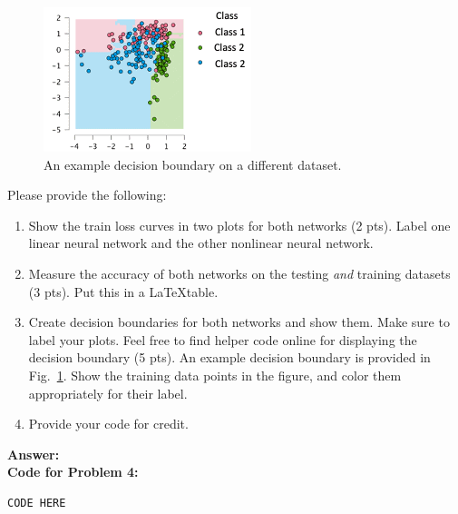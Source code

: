 \documentclass[11pt, oneside]{article}   	%
\begin{document}
\begin{figure}
    \centering
    \includegraphics{example.png}
    \caption{An example decision boundary on a different dataset.}
    \label{fig:example}
\end{figure}


Please provide the following:
\begin{enumerate}
    \item Show the train loss curves in two plots for both networks (2 pts). Label one linear neural network and the other nonlinear neural network.
    \item Measure the accuracy of both networks on the testing \emph{and} training datasets (3 pts). Put this in a \LaTeX table.
    \item   Create decision boundaries for both networks and show them. Make sure to label your plots. Feel free to find helper code online for displaying the decision boundary (5 pts). An example decision boundary is provided in Fig.~\ref{fig:example}. Show the training data points in the figure, and color them appropriately for their label.
    \item Provide your code for credit.

\end{enumerate}


\textbf{Answer:} \\



\textbf{Code for Problem 4:} \\
\begin{verbatim}
CODE HERE
\end{verbatim}
\end{document}
